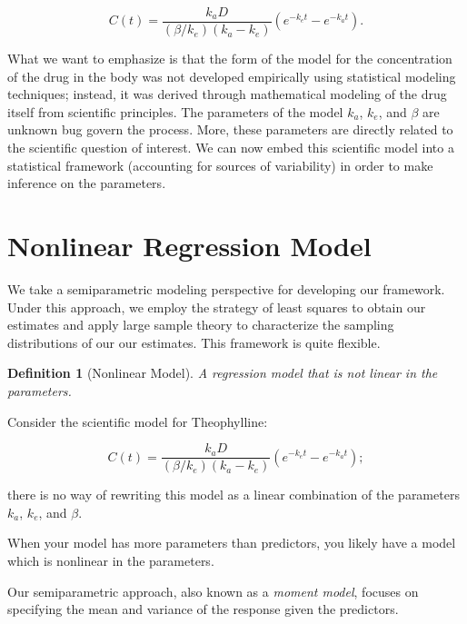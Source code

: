 \documentclass[
]{book}
\theoremstyle{plain}
\theoremstyle{mydefn}
\newtheorem{definition}{Definition}[chapter]
\theoremstyle{myexmpl}
\theoremstyle{remark}
\begin{document}
\[C(t) = \frac{k_a D}{\left(\beta/k_e\right)\left(k_a - k_e\right)} \left(e^{-k_e t} - e^{-k_a t}\right).\]

What we want to emphasize is that the form of the model for the concentration of the drug in the body was not developed empirically using statistical modeling techniques; instead, it was derived through mathematical modeling of the drug itself from scientific principles. The parameters of the model \(k_a\), \(k_e\), and \(\beta\) are unknown bug govern the process. More, these parameters are directly related to the scientific question of interest. We can now embed this scientific model into a statistical framework (accounting for sources of variability) in order to make inference on the parameters.

\hypertarget{nonlinear-regression-model}{%
\section{Nonlinear Regression Model}\label{nonlinear-regression-model}}

We take a semiparametric modeling perspective for developing our framework. Under this approach, we employ the strategy of least squares to obtain our estimates and apply large sample theory to characterize the sampling distributions of our our estimates. This framework is quite flexible.

\begin{definition}[Nonlinear Model]
\protect\hypertarget{def:defn-nlm}{}{\label{def:defn-nlm} {} }A regression model that is \emph{not} linear in the parameters.
\end{definition}

Consider the scientific model for Theophylline:

\[C(t) = \frac{k_a D}{\left(\beta/k_e\right)\left(k_a - k_e\right)} \left(e^{-k_e t} - e^{-k_a t}\right);\]

there is no way of rewriting this model as a linear combination of the parameters \(k_a\), \(k_e\), and \(\beta\).

\begin{rmdtip}
When your model has more parameters than predictors, you likely have a model which is nonlinear in the parameters.
\end{rmdtip}

Our semiparametric approach, also known as a \emph{moment model}, focuses on specifying the mean and variance of the response given the predictors.
\end{document}
